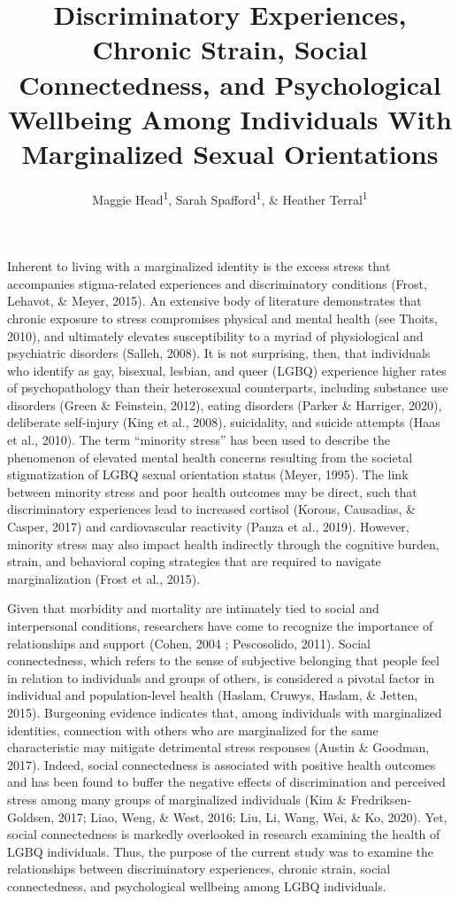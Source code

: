 \documentclass[
  english,
  man,floatsintext]{apa6}
\title{Discriminatory Experiences, Chronic Strain, Social Connectedness, and Psychological Wellbeing Among Individuals With Marginalized Sexual Orientations}
\author{Maggie Head\textsuperscript{1}, Sarah Spafford\textsuperscript{1}, \& Heather Terral\textsuperscript{1}}
\date{}
\affiliation{\vspace{0.5cm}\textsuperscript{1} University of Oregon}
\begin{document}
\maketitle

Inherent to living with a marginalized identity is the excess stress that accompanies stigma-related experiences and discriminatory conditions (Frost, Lehavot, \& Meyer, 2015). An extensive body of literature demonstrates that chronic exposure to stress compromises physical and mental health (see Thoits, 2010), and ultimately elevates susceptibility to a myriad of physiological and psychiatric disorders (Salleh, 2008). It is not surprising, then, that individuals who identify as gay, bisexual, lesbian, and queer (LGBQ) experience higher rates of psychopathology than their heterosexual counterparts, including substance use disorders (Green \& Feinstein, 2012), eating disorders (Parker \& Harriger, 2020), deliberate self-injury (King et al., 2008), suicidality, and suicide attempts (Haas et al., 2010). The term \enquote{minority stress} has been used to describe the phenomenon of elevated mental health concerns resulting from the societal stigmatization of LGBQ sexual orientation status (Meyer, 1995). The link between minority stress and poor health outcomes may be direct, such that discriminatory experiences lead to increased cortisol (Korous, Causadias, \& Casper, 2017) and cardiovascular reactivity (Panza et al., 2019). However, minority stress may also impact health indirectly through the cognitive burden, strain, and behavioral coping strategies that are required to navigate marginalization (Frost et al., 2015).

Given that morbidity and mortality are intimately tied to social and interpersonal conditions, researchers have come to recognize the importance of relationships and support (Cohen, 2004 ; Pescosolido, 2011). Social connectedness, which refers to the sense of subjective belonging that people feel in relation to individuals and groups of others, is considered a pivotal factor in individual and population-level health (Haslam, Cruwys, Haslam, \& Jetten, 2015). Burgeoning evidence indicates that, among individuals with marginalized identities, connection with others who are marginalized for the same characteristic may mitigate detrimental stress responses (Austin \& Goodman, 2017). Indeed, social connectedness is associated with positive health outcomes and has been found to buffer the negative effects of discrimination and perceived stress among many groups of marginalized individuals (Kim \& Fredriksen-Goldsen, 2017; Liao, Weng, \& West, 2016; Liu, Li, Wang, Wei, \& Ko, 2020). Yet, social connectedness is markedly overlooked in research examining the health of LGBQ individuals. Thus, the purpose of the current study was to examine the relationships between discriminatory experiences, chronic strain, social connectedness, and psychological wellbeing among LGBQ individuals.
\end{document}
